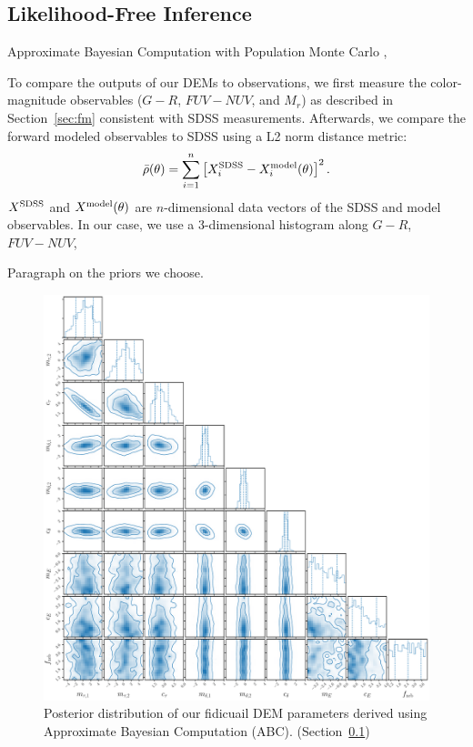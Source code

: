 \subsection{Likelihood-Free Inference} \label{sec:abc}
Approximate Bayesian Computation with Population Monte Carlo \cite{hahn2017a},

To compare the outputs of our DEMs to observations, we first measure the color-magnitude
observables ($G-R$, $FUV-NUV$, and $M_r$) as described in Section~\ref{sec:fm}
consistent with SDSS measurements. Afterwards, we compare the forward modeled
observables to SDSS using a L2 norm distance metric: 
\begin{equation}
    \bar{\rho}(\theta) = \sum\limits_{i=1}^{n} \left[X^{\rm SDSS}_i - X^{\rm model}_i(\theta) \right]^2.
\end{equation}
$X^{\rm SDSS}$ and $X^{\rm model}(\theta)$ are $n$-dimensional data vectors of
the SDSS and model observables. In our case, we use a 3-dimensional histogram
along $G-R$, $FUV-NUV$, 

\cite{ishida2015} 

Paragraph on the priors we choose. 

\begin{figure}
\begin{center}
    \includegraphics[width=\textwidth]{figs/abc.pdf}
    \caption{Posterior distribution of our fidicuail DEM parameters derived
    using Approximate Bayesian Computation (ABC). (Section~\ref{sec:abc})}
\label{fig:abc}
\end{center}
\end{figure}


